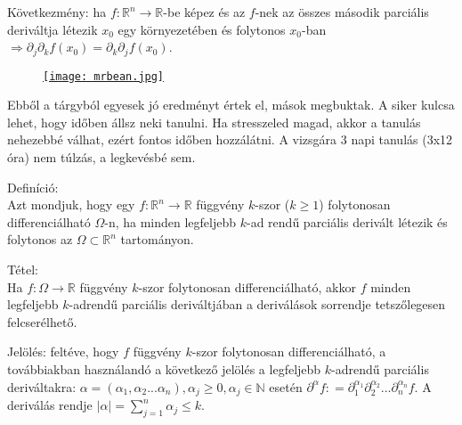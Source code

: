 \documentclass[12pt,a4paper]{scrartcl}
\newenvironment{definicio}{}{}
\newenvironment{tetel}{}{}
\newenvironment{ajanlofig}{\begin{figure}\begin{center}}{
\end{center}\end{figure}}
\begin{document}
Következmény: ha
\(\left. f:{\mathbb{R}}^{n}\rightarrow{\mathbb{R}} \right.\)-be képez és
az \(f\)-nek az összes második parciális deriváltja létezik \(x_{0}\)
egy környezetében és folytonos \(x_{0}\)-ban
\(\left. \Rightarrow\partial_{j}\partial_{k}f\left( x_{0} \right) = \partial_{k}\partial_{j}f\left( x_{0} \right) \right.\).

\begin{ajanlo}

\begin{ajanlofig}

\href{https://www.youtube.com/watch?v=ye27aIJD6qg}{\texttt{[image: mrbean.jpg]}}

\end{ajanlofig}

Ebből a tárgyból egyesek jó eredményt értek el, mások megbuktak. A siker
kulcsa lehet, hogy időben állsz neki tanulni. Ha stresszeled magad,
akkor a tanulás nehezebbé válhat, ezért fontos időben hozzálátni. A
vizsgára 3 napi tanulás (3x12 óra) nem túlzás, a legkevésbé sem.

\end{ajanlo}

\begin{definicio}

Definíció:\\
Azt mondjuk, hogy egy
\(\left. f:{\mathbb{R}}^{n}\rightarrow{\mathbb{R}} \right.\) függvény
\(k\)-szor (\(k \geq 1\)) folytonosan differenciálható \(\Omega\)-n, ha
minden legfeljebb \(k\)-ad rendű parciális derivált létezik és folytonos
az \(\Omega \subset {\mathbb{R}}^{n}\) tartományon.

\end{definicio}

\begin{tetel}

Tétel:\\
Ha \(\left. f:\Omega\rightarrow{\mathbb{R}} \right.\) függvény
\(k\)-szor folytonosan differenciálható, akkor \(f\) minden legfeljebb
\(k\)-adrendű parciális deriváltjában a deriválások sorrendje
tetszőlegesen felcserélhető.

\end{tetel}

Jelölés: feltéve, hogy \(f\) függvény \(k\)-szor folytonosan
differenciálható, a továbbiakban használandó a következő jelölés a
legfeljebb \(k\)-adrendű parciális deriváltakra:
\(\alpha = \left( {\alpha_{1},\alpha_{2}...\alpha_{n}} \right),\alpha_{j} \geq 0,\alpha_{j} \in {\mathbb{N}}\)
esetén
\(\partial^{\alpha}f: = \partial_{1}^{\alpha_{1}}\partial_{2}^{\alpha_{2}}...\partial_{n}^{\alpha_{n}}f\).
A deriválás rendje
\(\left| \alpha \right| = {\sum\limits_{j = 1}^{n}\alpha_{j}} \leq k\).
\end{document}
